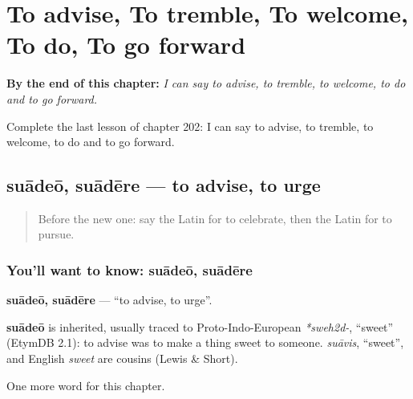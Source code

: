 
\chapter{To advise, To tremble, To welcome, To do, To go forward}
\label{ch:la-to-advise-to-tremble-to-welcome-to-do-to-go-forward}

\begin{chapteropening}
\textbf{By the end of this chapter:} \emph{I can say to advise, to tremble, to welcome, to do and to go forward.}

Complete the last lesson of chapter 202: I can say to advise, to tremble, to welcome, to do and to go forward.
\end{chapteropening}

\section[suādeō, suādēre]{suādeō, suādēre — to advise, to urge}

\label{lesson:LA-C202-suadeo}



\begin{quote}
Before the new one: say the Latin for to celebrate, then the Latin for to pursue.
\end{quote}

\subsection*{You'll want to know: suādeō, suādēre}
\textbf{suādeō, suādēre} — \textquotedblleft{}to advise, to urge\textquotedblright{}.

\begin{cousinweb}
\textbf{suādeō} is inherited, usually traced to Proto-Indo-European \emph{*sweh2d-}, \textquotedblleft{}sweet\textquotedblright{} (EtymDB 2.1): to advise was to make a thing sweet to someone. \emph{suāvis}, \textquotedblleft{}sweet\textquotedblright{}, and English \emph{sweet} are cousins (Lewis \& Short).
\end{cousinweb}

\begin{grammarlens}[title={What you've built}]
One more word for this chapter.
\end{grammarlens}

